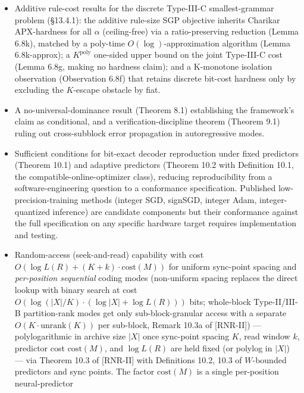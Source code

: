 \documentclass[
]{article}
\begin{document}
\begin{itemize}
  transformer's discrete autoregressive field, together with the
  associated exact finite-block entropy complexity arc --- is developed
  in the companion Part [RNR-II] (the Remark 7.15a--7.15i sequence).
\item
  Additive rule-cost results for the discrete Type-III-C
  smallest-grammar problem (§13.4.1): the additive rule-size SGP
  objective inherits Charikar APX-hardness for all $\alpha$
  (ceiling-free) via a ratio-preserving reduction (Lemma 6.8k),
  matched by a poly-time $O(\log)$-approximation algorithm
  (Lemma 6.8k-approx); a $K^{\mathrm{poly}}$ one-sided upper bound on
  the joint Type-III-C cost (Lemma 6.8g, making no hardness claim);
  and a K-monotone isolation observation (Observation 6.8f) that
  retains discrete bit-cost hardness only by excluding the
  $K$-escape obstacle by fiat.
\item
  A no-universal-dominance result (Theorem 8.1) establishing the
  framework's claim as conditional, and a verification-discipline
  theorem (Theorem 9.1) ruling out cross-subblock error propagation
  in autoregressive modes.
\item
  Sufficient conditions for bit-exact decoder reproduction under
  fixed predictors (Theorem 10.1) and adaptive predictors (Theorem
  10.2 with Definition 10.1, the compatible-online-optimizer class),
  reducing reproducibility from a software-engineering question to a
  conformance specification. Published low-precision-training methods
  (integer SGD, signSGD, integer Adam, integer-quantized inference)
  are candidate components but their conformance against the full
  specification on any specific hardware target requires implementation
  and testing.
\item
  Random-access (seek-and-read) capability with cost
  $O(\log L(R) + (K + k) \cdot \mathrm{cost}(M))$ for uniform
  sync-point spacing and \emph{per-position sequential} coding
  modes (non-uniform spacing replaces the direct lookup with binary
  search at cost
  $O(\log(|X|/K) \cdot (\log |X| + \log L(R)))$ bits;
  whole-block Type-II/III-B partition-rank modes get only
  sub-block-granular access with a separate
  $O(K \cdot \mathrm{unrank}(K))$ per sub-block, Remark 10.3a of [RNR-II])
  --- polylogarithmic in archive size $|X|$ once sync-point spacing
  $K$, read window $k$, predictor cost $\mathrm{cost}(M)$, and
  $\log L(R)$ are held fixed (or polylog in $|X|$) --- via Theorem 10.3 of [RNR-II]
  with Definitions 10.2, 10.3 of $W$-bounded predictors and sync points.
  The factor $\mathrm{cost}(M)$ is a single per-position neural-predictor

\end{itemize}
\end{document}
